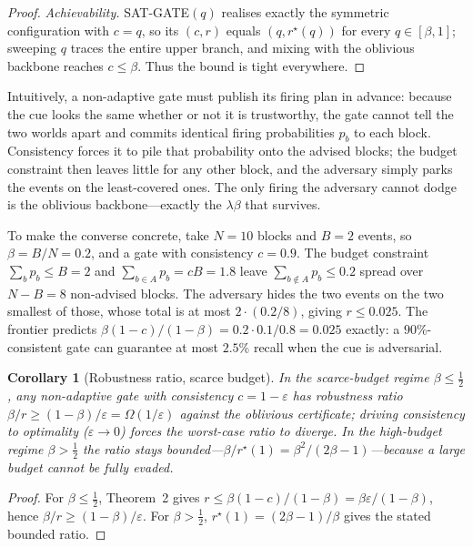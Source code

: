 ﻿\documentclass[lettersize,journal]{IEEEtran}
\newtheorem*{cor}{Corollary}
\begin{document}
\begin{proof}
\emph{Achievability.} \textsc{SAT-GATE}$(q)$ realises exactly the symmetric configuration with $c=q$, so its $(c,r)$ equals $(q,r^\star(q))$ for every $q\in[\beta,1]$; sweeping $q$ traces the entire upper branch, and mixing with the oblivious backbone reaches $c\le\beta$. Thus the bound is tight everywhere.
\end{proof}

Intuitively, a non-adaptive gate must publish its firing plan in advance: because the cue looks the same whether or not it is trustworthy, the gate cannot tell the two worlds apart and commits identical firing probabilities $p_b$ to each block. Consistency forces it to pile that probability onto the advised blocks; the budget constraint then leaves little for any other block, and the adversary simply parks the events on the least-covered ones. The only firing the adversary cannot dodge is the oblivious backbone---exactly the $\lambda\beta$ that survives.

To make the converse concrete, take $N{=}10$ blocks and $B{=}2$ events, so $\beta=B/N=0.2$, and a gate with consistency $c{=}0.9$. The budget constraint $\sum_b p_b\le B=2$ and $\sum_{b\in A}p_b=cB=1.8$ leave $\sum_{b\notin A}p_b\le0.2$ spread over $N-B=8$ non-advised blocks. The adversary hides the two events on the two smallest of those, whose total is at most $2\cdot(0.2/8)$, giving $r\le0.025$. The frontier predicts $\beta(1-c)/(1-\beta)=0.2\cdot0.1/0.8=0.025$ exactly: a $90\%$-consistent gate can guarantee at most $2.5\%$ recall when the cue is adversarial.

\begin{cor}[Robustness ratio, scarce budget]
In the scarce-budget regime $\beta\le\tfrac12$, any non-adaptive gate with consistency $c=1-\varepsilon$ has robustness ratio $\beta/r\ge(1-\beta)/\varepsilon=\Omega(1/\varepsilon)$ against the oblivious certificate; driving consistency to optimality ($\varepsilon\to0$) forces the worst-case ratio to diverge. In the high-budget regime $\beta>\tfrac12$ the ratio stays bounded---$\beta/r^\star(1)=\beta^2/(2\beta-1)$---because a large budget cannot be fully evaded.
\end{cor}
\begin{proof}
For $\beta\le\tfrac12$, Theorem~2 gives $r\le\beta(1-c)/(1-\beta)=\beta\varepsilon/(1-\beta)$, hence $\beta/r\ge(1-\beta)/\varepsilon$. For $\beta>\tfrac12$, $r^\star(1)=(2\beta-1)/\beta$ gives the stated bounded ratio.
\end{proof}
\end{document}
